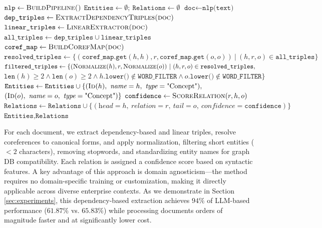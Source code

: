 \documentclass[runningheads]{llncs}
\begin{document}
\begin{algorithm}[h!]\scriptsize
\caption{\scriptsize Dependency-Based Knowledge Graph Construction with Coreference\protect\footnotemark}
\label{alg:dep-kg-coref}
\begin{algorithmic}[1]
\State $\texttt{nlp} \gets \textsc{BuildPipeline()}$
\State $\texttt{Entities} \gets \emptyset;\ \texttt{Relations} \gets \emptyset$
  \State $\texttt{doc} \gets \texttt{nlp(text)}$
  \State $\texttt{dep\_triples} \gets \textsc{ExtractDependencyTriples(doc)}$
  \State $\texttt{linear\_triples} \gets \textsc{LinearExtractor(doc)}$
  \State $\texttt{all\_triples} \gets \texttt{dep\_triples} \cup \texttt{linear\_triples}$
  \State $\texttt{coref\_map} \gets \textsc{BuildCorefMap(doc)}$
  \State $\texttt{resolved\_triples} \gets \{(\texttt{coref\_map.get}(h,h), r, \texttt{coref\_map.get}(o,o))\ |\ (h,r,o)\in\texttt{all\_triples}\}$
  \State $\texttt{filtered\_triples} \gets \{(\textsc{Normalize}(h), r, \textsc{Normalize}(o))\ |\ (h,r,o)\in\texttt{resolved\_triples},$
  \Statex \hspace{2em} $\texttt{len}(h)\ge2 \wedge \texttt{len}(o)\ge2 \wedge h.\texttt{lower()}\notin\texttt{WORD\_FILTER} \wedge o.\texttt{lower()}\notin\texttt{WORD\_FILTER}\}$
    \State $\texttt{Entities} \gets \texttt{Entities} \cup \{(\textsc{Id}(h),\ \textit{name}=h,\ \textit{type}=\text{"Concept"}),$
    \Statex \hspace{3em} $(\textsc{Id}(o),\ \textit{name}=o,\ \textit{type}=\text{"Concept"})\}$
    \State $\texttt{confidence} \gets \textsc{ScoreRelation}(r,h,o)$ 
    \State $\texttt{Relations} \gets \texttt{Relations} \cup \{(\textit{head}=h,\ \textit{relation}=r,\ \textit{tail}=o,\ \textit{confidence}=\texttt{confidence})\}$
  \EndFor
\EndFor
\State \Return $\texttt{Entities}, \texttt{Relations}$
\end{algorithmic}
\end{algorithm}

For each document, we extract dependency-based and linear triples, resolve coreferences to canonical forms, and apply normalization, filtering short entities ($< 2$ characters), removing stopwords, and standardizing entity names for graph DB compatibility. Each relation is assigned a confidence score based on syntactic features.
A key advantage of this approach is domain agnosticism—the method requires no domain-specific training or customization, making it directly applicable across diverse enterprise contexts. As we demonstrate in Section \ref{sec:experiments}, this dependency-based extraction achieves $94\%$ of LLM-based performance ($61.87\%$ vs. $65.83\%$) while processing documents orders of magnitude faster and at significantly lower cost.
\vspace{-6mm}
\end{document}
